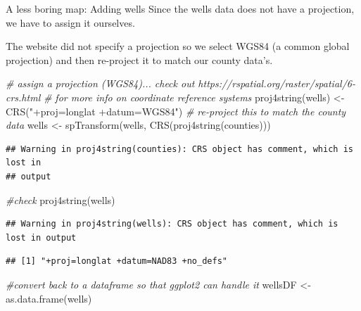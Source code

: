 \documentclass[
  ignorenonframetext,
]{beamer}
\newenvironment{Shaded}{\begin{snugshade}}{\end{snugshade}}
\newcommand{\CommentTok}[1]{\textcolor[rgb]{0.56,0.35,0.01}{\textit{#1}}}
\newcommand{\FunctionTok}[1]{\textcolor[rgb]{0.00,0.00,0.00}{#1}}
\newcommand{\NormalTok}[1]{#1}
\newcommand{\OtherTok}[1]{\textcolor[rgb]{0.56,0.35,0.01}{#1}}
\newcommand{\StringTok}[1]{\textcolor[rgb]{0.31,0.60,0.02}{#1}}
\begin{document}
\begin{frame}[fragile]{A less boring map: Adding wells}
\protect\hypertarget{a-less-boring-map-adding-wells-2}{}
Since the wells data does not have a projection, we have to assign it
ourselves.

The website did not specify a projection so we select WGS84 (a common
global projection) and then re-project it to match our county data's.

\tiny

\begin{Shaded}
\begin{Highlighting}[]
\CommentTok{\# assign a projection (WGS84)... check out https://rspatial.org/raster/spatial/6{-}crs.html }
\CommentTok{\# for more info on coordinate reference systems}
\FunctionTok{proj4string}\NormalTok{(wells) }\OtherTok{\textless{}{-}} \FunctionTok{CRS}\NormalTok{(}\StringTok{"+proj=longlat +datum=WGS84"}\NormalTok{)}
\CommentTok{\# re{-}project this to match the county data}
\NormalTok{wells }\OtherTok{\textless{}{-}} \FunctionTok{spTransform}\NormalTok{(wells, }\FunctionTok{CRS}\NormalTok{(}\FunctionTok{proj4string}\NormalTok{(counties)))}
\end{Highlighting}
\end{Shaded}

\begin{verbatim}
## Warning in proj4string(counties): CRS object has comment, which is lost in
## output
\end{verbatim}

\begin{Shaded}
\begin{Highlighting}[]
\CommentTok{\#check}
\FunctionTok{proj4string}\NormalTok{(wells)}
\end{Highlighting}
\end{Shaded}

\begin{verbatim}
## Warning in proj4string(wells): CRS object has comment, which is lost in output
\end{verbatim}

\begin{verbatim}
## [1] "+proj=longlat +datum=NAD83 +no_defs"
\end{verbatim}

\begin{Shaded}
\begin{Highlighting}[]
\CommentTok{\#convert back to a dataframe  so that ggplot2 can handle it}
\NormalTok{wellsDF }\OtherTok{\textless{}{-}} \FunctionTok{as.data.frame}\NormalTok{(wells)}
\end{Highlighting}
\end{Shaded}
\end{frame}
\end{document}
